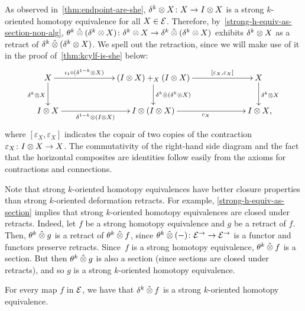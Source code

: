 \documentclass[reqno,10pt,a4paper,oneside,draft]{amsart}
\begin{document}
{{As observed in~\cref{thm:endpoint-are-she}, $\kcyl \otimes X \co X \to \interval \otimes X$ is a strong $k$-oriented homotopy equivalence for all $X \in \cal{E}$.
Therefore, by~\cref{strong-h-equiv-as-section-non-alg}, $\thetak \hatotimes (\kcyl \otimes X)  \co \kcyl \otimes X \to \kcyl \hatotimes (\kcyl \otimes X)$ exhibits $\kcyl \otimes X$ as a retract of
$\kcyl \hatotimes (\kcyl \otimes X)$. We spell out the retraction, since we will make use of it in the proof of~\cref{thm:kcylf-is-she} below:
\begin{equation}
\label{equ:kcyl-as-retract}
\begin{gathered}
\xymatrix@C+4em{
  X
  \ar[r]^-{\iota_1 \cc (\kcylinv \otimes X)}
  \ar[d]_{\kcyl \otimes X}
&
  (\interval \otimes X) +_X (\interval \otimes X)
  \ar[d]^{\kcyl \hatotimes (\kcyl \otimes X)}
  \ar[r]^-{[\varepsilon_X, \varepsilon_X]}
&
  X
  \ar[d]^{\kcyl \otimes X}
\\
  \interval \otimes X
  \ar[r]_-{\kcylinv \otimes (\interval \otimes X)}
&
  \interval \otimes (\interval \otimes X)
  \ar[r]_{c_X}
&
  \interval \otimes X
\rlap{,}}
\end{gathered}
\end{equation}
where $[\varepsilon_X, \varepsilon_X]$ indicates the copair of two copies of the contraction $\varepsilon_X \co \interval \otimes X \to X$. The commutativity of the right-hand side diagram
and the fact that the horizontal composites are identities follow easily from the axioms for contractions and connections.


Note that strong $k$-oriented homotopy equivalences have better closure properties than strong $k$-oriented deformation retracts.
For example, \cref{strong-h-equiv-as-section} implies that strong $k$-oriented homotopy equivalences are closed under retracts.
Indeed, let $f$ be a strong homotopy equivalence and $g$ be a retract of $f$.
Then, $\thetak \hatotimes g$ is a retract of $\thetak \hatotimes f$, since $\thetak \hatotimes (-) \co \catE^\to \to \catE^\to$ is a functor and functors preserve retracts.
Since~$f$ is a strong homotopy equivalence, $\thetak \hatotimes f$ is a section.
But then $\thetak \hatotimes g$ is also a section (since sections are closed under retracts), and so $g$ is a strong $k$-oriented homotopy equivalence.

\begin{lemma} \label{thm:kcylf-is-she}
For every map $f$ in $\cal{E}$, we have that $\kcyl \hatotimes f$ is a strong $k$-oriented homotopy equivalence.
\end{lemma}

}}
\end{document}
